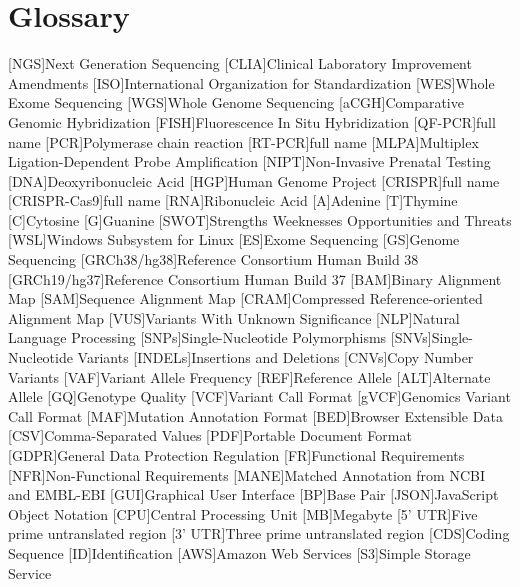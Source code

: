 \chapter{Glossary}

\footnotesize
\SingleSpacing

\begin{multicols}{2}
\begin{acronym}[AAAAAA]

	[NGS]{Next Generation Sequencing}
	[CLIA]{Clinical Laboratory Improvement Amendments}
	[ISO]{International Organization for Standardization}
	[WES]{Whole Exome Sequencing}
	[WGS]{Whole Genome Sequencing}
	[aCGH]{Comparative Genomic Hybridization}
	[FISH]{Fluorescence In Situ Hybridization}
	[QF-PCR]{full name}
	[PCR]{Polymerase chain reaction}
	[RT-PCR]{full name}
	[MLPA]{Multiplex Ligation-Dependent Probe Amplification}
	[NIPT]{Non-Invasive Prenatal Testing}
	[DNA]{Deoxyribonucleic Acid}
	[HGP]{Human Genome Project}
	[CRISPR]{full name}
	[CRISPR-Cas9]{full name}
	[RNA]{Ribonucleic Acid}
	{Adenine}
	{Thymine}
	{Cytosine}
	{Guanine}
	[SWOT]{Strengths Weeknesses Opportunities and Threats}
	[WSL]{Windows Subsystem for Linux}
	[ES]{Exome Sequencing}
	[GS]{Genome Sequencing}
	[GRCh38/hg38]{Reference Consortium Human Build 38}
	[GRCh19/hg37]{Reference Consortium Human Build 37}
	[BAM]{Binary Alignment Map}
	[SAM]{Sequence Alignment Map}
	[CRAM]{Compressed Reference-oriented Alignment Map}
	[VUS]{Variants With Unknown Significance}
	[NLP]{Natural Language Processing}
	[SNPs]{Single-Nucleotide Polymorphisms}
	[SNVs]{Single-Nucleotide Variants}
	[INDELs]{Insertions and Deletions}
	[CNVs]{Copy Number Variants}
	[VAF]{Variant Allele Frequency}
	[REF]{Reference Allele}
	[ALT]{Alternate Allele}
	[GQ]{Genotype Quality}
	[VCF]{Variant Call Format}
	[gVCF]{Genomics Variant Call Format}
	[MAF]{Mutation Annotation Format}
	[BED]{Browser Extensible Data}
	[CSV]{Comma-Separated Values}
	[PDF]{Portable Document Format}
	[GDPR]{General Data Protection Regulation}
	[FR]{Functional Requirements}
	[NFR]{Non-Functional Requirements}
	[MANE]{Matched Annotation from NCBI and EMBL-EBI}
	[GUI]{Graphical User Interface}
	[BP]{Base Pair}
	[JSON]{JavaScript Object Notation}
	[CPU]{Central Processing Unit}
	[MB]{Megabyte}
	[5' UTR]{Five prime untranslated region}
	[3' UTR]{Three prime untranslated region}
	[CDS]{Coding Sequence}
	[ID]{Identification}
	[AWS]{Amazon Web Services}
	[S3]{Simple Storage Service}


\end{acronym}
\end{multicols}

